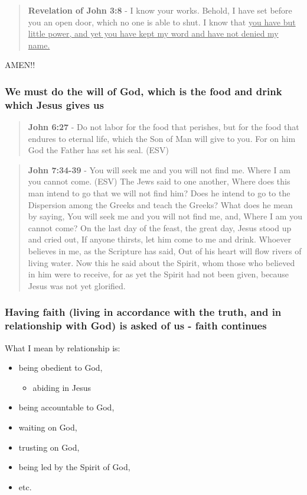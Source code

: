 \documentclass[11pt]{article}
\begin{document}
\begin{quote}
\textbf{Revelation of John 3:8} - I know your works. Behold, I have set before you an open door, which no one is able to shut. I know that \uline{you have but little power, and yet you have kept my word and have not denied my name.}
\end{quote}

AMEN!!

\subsubsection{We must do the will of God, which is the food and drink which Jesus gives us}
\label{sec:org1658fe7}
\begin{quote}
\textbf{John 6:27} - Do not labor for the food that perishes, but for the food that endures to eternal life, which the Son of Man will give to you. For on him God the Father has set his seal. (ESV)
\end{quote}

\begin{quote}
\textbf{John 7:34-39} - You will seek me and you will not find me. Where I am you cannot come. (ESV) The Jews said to one another, Where does this man intend to go that we will not find him? Does he intend to go to the Dispersion among the Greeks and teach the Greeks?  What does he mean by saying, You will seek me and you will not find me, and, Where I am you cannot come?  On the last day of the feast, the great day, Jesus stood up and cried out, If anyone thirsts, let him come to me and drink.  Whoever believes in me, as the Scripture has said, Out of his heart will flow rivers of living water.  Now this he said about the Spirit, whom those who believed in him were to receive, for as yet the Spirit had not been given, because Jesus was not yet glorified.
\end{quote}

\subsubsection{Having faith (living in accordance with the truth, and in relationship with God) is asked of us - faith continues}
\label{sec:org3ee1b35}
What I mean by relationship is:
\begin{itemize}
\item being obedient to God,
\begin{itemize}
\item abiding in Jesus
\end{itemize}
\item being accountable to God,
\item waiting on God,
\item trusting on God,
\item being led by the Spirit of God,
\item etc.
\end{itemize}
\end{document}
